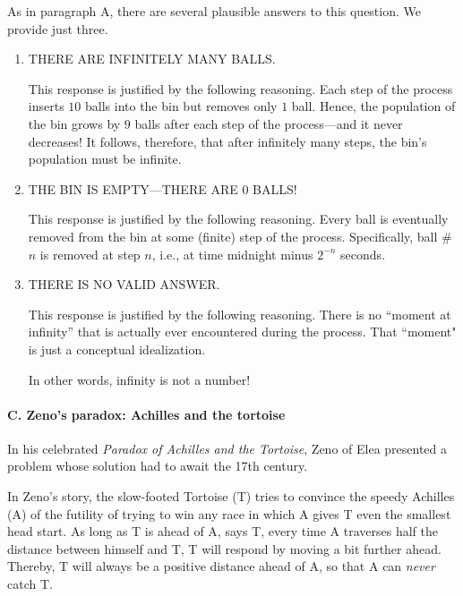 \noindent
As in paragraph {\small\sf A}, there are several plausible answers to this question.  We provide just three.
\begin{enumerate}
\item
THERE ARE INFINITELY MANY BALLS.

\smallskip

This response is justified by the following reasoning.  Each step of the process inserts $10$ balls into the bin but removes only $1$ ball.  Hence, the population of the bin grows by $9$ balls after each step of the process---and it never decreases!  It follows, therefore, that after infinitely many steps, the bin's population must be infinite.

\item
THE BIN IS EMPTY---THERE ARE $0$ BALLS!

\smallskip

This response is justified by the following reasoning.  Every ball is eventually removed from the bin at some (finite) step of the process. Specifically, ball \#$n$ is removed at step $n$, i.e., at time midnight minus $2^{-n}$ seconds.

\item
THERE IS NO VALID ANSWER.

\smallskip

This response is justified by the following reasoning.  There is no ``moment at infinity'' that is actually ever encountered during the process.  That ``moment" is just a conceptual idealization.

\smallskip

In other words, infinity is not a number!
\end{enumerate}


\paragraph{C.  Zeno's paradox: Achilles and the tortoise}

  
In his celebrated {\it Paradox of Achilles and the Tortoise}, Zeno of Elea  presented a problem whose solution had to await the 17th century.

\smallskip

In Zeno's story, the slow-footed Tortoise (T) tries to convince the speedy Achilles (A) of the futility of trying to win any race in which A gives T even the smallest head start.  As long as T is ahead of A, says T, every time A traverses half the distance between himself and T, T will respond by moving a bit further ahead.  Thereby, T will always be a positive distance ahead of A, so that A can {\em never} catch T.

